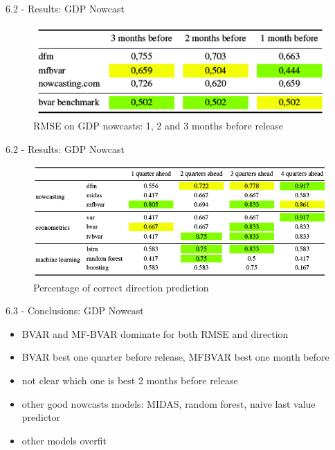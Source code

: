 \begin{frame}{6.2 - Results: GDP Nowcast}
\begin{figure}[h]
	\centering
	\includegraphics[width=.6\linewidth]{im3}
	\caption{RMSE on GDP nowcasts: 1, 2 and 3 months before release}
	\label{fig_62_3}
\end{figure}
\end{frame}

\begin{frame}{6.2 - Results: GDP Nowcast}
\begin{figure}[h]
	\centering
	\includegraphics[width=.9\linewidth]{im4}
	\caption{Percentage of correct direction prediction}
	\label{fig_62_4}
\end{figure}
\end{frame}

\begin{frame}{6.3 - Conclusions: GDP Nowcast}
	\begin{itemize}
	\item BVAR and MF-BVAR dominate for both RMSE and direction
	\item BVAR best one quarter before release, MFBVAR best one month before
	\item not clear which one is best 2 months before release
	\item other good nowcasts models: MIDAS, random forest, naive last value predictor
	\item other models overfit
	\end{itemize}	
\end{frame}

